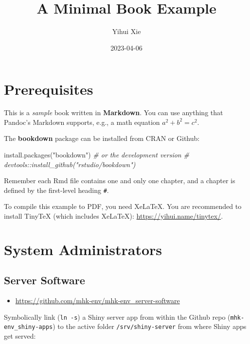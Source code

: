 \documentclass[
]{book}
\title{A Minimal Book Example}
\author{Yihui Xie}
\date{2023-04-06}
\newenvironment{Shaded}{\begin{snugshade}}{\end{snugshade}}
\newcommand{\CommentTok}[1]{\textcolor[rgb]{0.56,0.35,0.01}{\textit{#1}}}
\newcommand{\FunctionTok}[1]{\textcolor[rgb]{0.00,0.00,0.00}{#1}}
\newcommand{\NormalTok}[1]{#1}
\newcommand{\StringTok}[1]{\textcolor[rgb]{0.31,0.60,0.02}{#1}}
\providecommand{\tightlist}{%
  \setlength{\itemsep}{0pt}\setlength{\parskip}{0pt}}
\begin{document}
\maketitle

{
\setcounter{tocdepth}{1}
\tableofcontents
}
\hypertarget{prerequisites}{%
\chapter{Prerequisites}\label{prerequisites}}

This is a \emph{sample} book written in \textbf{Markdown}. You can use anything that Pandoc's Markdown supports, e.g., a math equation \(a^2 + b^2 = c^2\).

The \textbf{bookdown} package can be installed from CRAN or Github:

\begin{Shaded}
\begin{Highlighting}[]
\FunctionTok{install.packages}\NormalTok{(}\StringTok{"bookdown"}\NormalTok{)}
\CommentTok{\# or the development version}
\CommentTok{\# devtools::install\_github("rstudio/bookdown")}
\end{Highlighting}
\end{Shaded}

Remember each Rmd file contains one and only one chapter, and a chapter is defined by the first-level heading \texttt{\#}.

To compile this example to PDF, you need XeLaTeX. You are recommended to install TinyTeX (which includes XeLaTeX): \url{https://yihui.name/tinytex/}.

\hypertarget{sysadmins}{%
\chapter{System Administrators}\label{sysadmins}}

\hypertarget{server-software}{%
\section{Server Software}\label{server-software}}

\begin{itemize}
\tightlist
\item
  \url{https://github.com/mhk-env/mhk-env_server-software}
\end{itemize}

Symbolically link (\texttt{ln\ -s}) a Shiny server app from within the Github repo (\texttt{mhk-env\_shiny-apps}) to the active folder \texttt{/srv/shiny-server} from where Shiny apps get served:
\end{document}
